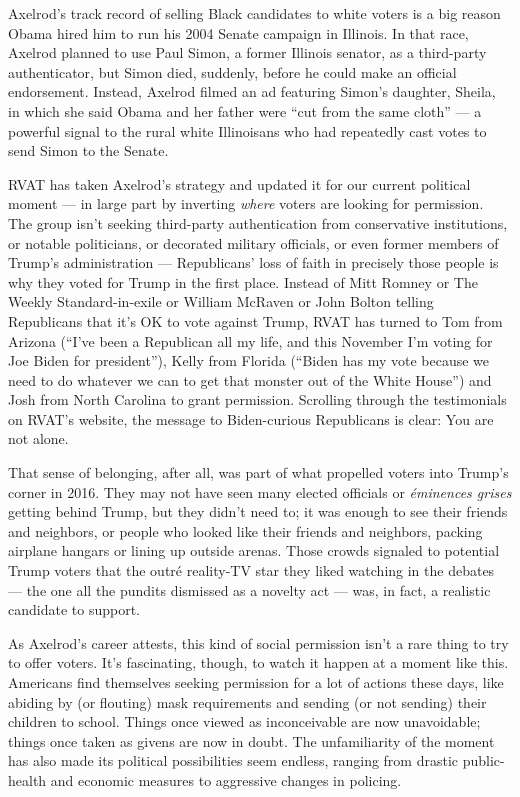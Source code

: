 Axelrod's track record of selling Black candidates to white voters is a
big reason Obama hired him to run his 2004 Senate campaign in Illinois.
In that race, Axelrod planned to use Paul Simon, a former Illinois
senator, as a third-party authenticator, but Simon died, suddenly,
before he could make an official endorsement. Instead, Axelrod filmed an
ad featuring Simon's daughter, Sheila, in which she said Obama and her
father were ``cut from the same cloth'' --- a powerful signal to the
rural white Illinoisans who had repeatedly cast votes to send Simon to
the Senate.

RVAT has taken Axelrod's strategy and updated it for our current
political moment --- in large part by inverting \emph{where} voters are
looking for permission. The group isn't seeking third-party
authentication from conservative institutions, or notable politicians,
or decorated military officials, or even former members of Trump's
administration --- Republicans' loss of faith in precisely those people
is why they voted for Trump in the first place. Instead of Mitt Romney
or The Weekly Standard-in-exile or William McRaven or John Bolton
telling Republicans that it's OK to vote against Trump, RVAT has turned
to Tom from Arizona (``I've been a Republican all my life, and this
November I'm voting for Joe Biden for president''), Kelly from Florida
(``Biden has my vote because we need to do whatever we can to get that
monster out of the White House'') and Josh from North Carolina to grant
permission. Scrolling through the testimonials on RVAT's website, the
message to Biden-curious Republicans is clear: You are not alone.

That sense of belonging, after all, was part of what propelled voters
into Trump's corner in 2016. They may not have seen many elected
officials or \emph{éminences grises} getting behind Trump, but they
didn't need to; it was enough to see their friends and neighbors, or
people who looked like their friends and neighbors, packing airplane
hangars or lining up outside arenas. Those crowds signaled to potential
Trump voters that the outré reality-TV star they liked watching in the
debates --- the one all the pundits dismissed as a novelty act --- was,
in fact, a realistic candidate to support.

As Axelrod's career attests, this kind of social permission isn't a rare
thing to try to offer voters. It's fascinating, though, to watch it
happen at a moment like this. Americans find themselves seeking
permission for a lot of actions these days, like abiding by (or
flouting) mask requirements and sending (or not sending) their children
to school. Things once viewed as inconceivable are now unavoidable;
things once taken as givens are now in doubt. The unfamiliarity of the
moment has also made its political possibilities seem endless, ranging
from drastic public-health and economic measures to aggressive changes
in policing.

